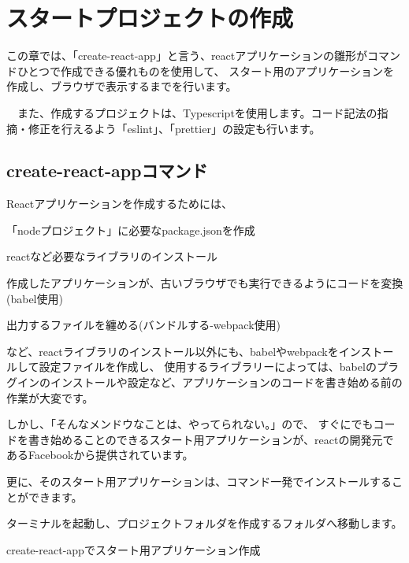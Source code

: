 \chapter{スタートプロジェクトの作成}
\label{chap:02-create-react-app}
\begin{starterabstract}
  この章では、「create{-}react{-}app」と言う、reactアプリケーションの雛形がコマンドひとつで作成できる優れものを使用して、
スタート用のアプリケーションを作成し、ブラウザで表示するまでを行います。

　また、作成するプロジェクトは、Typescriptを使用します。コード記法の指摘・修正を行えるよう「eslint」、「prettier」の設定も行います。

\end{starterabstract}

\section{create{-}react{-}appコマンド}
\keeplastskip{
  \label{sec:2-1}
  \label{sec-01command}
  \par\nobreak
}

Reactアプリケーションを作成するためには、

\begin{starteritemize}
\item 「nodeプロジェクト」に必要なpackage.jsonを作成
\item reactなど必要なライブラリのインストール
\item 作成したアプリケーションが、古いブラウザでも実行できるようにコードを変換(babel使用)
\item 出力するファイルを纏める(バンドルする{-}webpack使用)
\end{starteritemize}

など、reactライブラリのインストール以外にも、babelやwebpackをインストールして設定ファイルを作成し、
使用するライブラリーによっては、babelのプラグインのインストールや設定など、アプリケーションのコードを書き始める前の作業が大変です。

しかし、「そんなメンドウなことは、やってられない。」ので、
すぐにでもコードを書き始めることのできるスタート用アプリケーションが、reactの開発元であるFacebookから提供されています。

更に、そのスタート用アプリケーションは、コマンド一発でインストールすることができます。

ターミナルを起動し、プロジェクトフォルダを作成するフォルダへ移動します。

\def\startercodeblockfontsize{}
\begin{starterterminal}[]{create{-}react{-}appでスタート用アプリケーション作成}\end{starterterminal}


